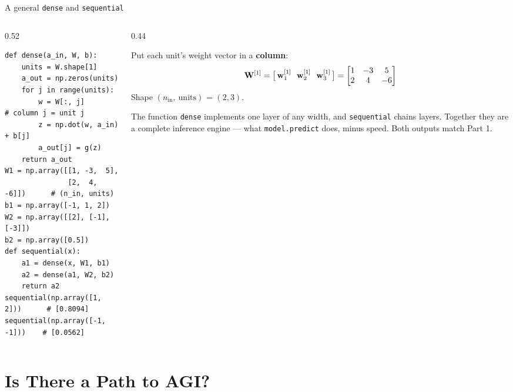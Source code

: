 \documentclass[aspectratio=169,10pt]{beamer}
\begin{document}
\begin{frame}[fragile]{A general \texttt{dense} and \texttt{sequential}}
  \begin{columns}[T,onlytextwidth]
    \begin{column}{0.52\textwidth}
\begin{lstlisting}
def dense(a_in, W, b):
    units = W.shape[1]
    a_out = np.zeros(units)
    for j in range(units):
        w = W[:, j]               # column j = unit j
        z = np.dot(w, a_in) + b[j]
        a_out[j] = g(z)
    return a_out
W1 = np.array([[1, -3,  5],
               [2,  4, -6]])      # (n_in, units)
b1 = np.array([-1, 1, 2])
W2 = np.array([[2], [-1], [-3]])
b2 = np.array([0.5])
def sequential(x):
    a1 = dense(x, W1, b1)
    a2 = dense(a1, W2, b2)
    return a2
sequential(np.array([1, 2]))      # [0.8094]
sequential(np.array([-1, -1]))    # [0.0562]
\end{lstlisting}
    \end{column}
    \begin{column}{0.44\textwidth}
      \footnotesize
      \begin{defnbox}
        \small
        Put each unit's weight vector in a \textbf{column}:
        \[ \mW^{[1]} = \bigl[\,\vw^{[1]}_1\ \ \vw^{[1]}_2\ \ \vw^{[1]}_3\,\bigr]
           = \begin{bmatrix}1&-3&5\\2&4&-6\end{bmatrix} \]
        Shape $(n_{\text{in}},\ \text{units})$ = $(2,3)$.
      \end{defnbox}
      \begin{keyidea}
        The function \texttt{dense} implements one layer of any width, and \texttt{sequential}
        chains layers. Together they are a complete inference engine --- what
        \texttt{model.predict} does, minus speed. Both outputs match Part 1.
      \end{keyidea}
    \end{column}
  \end{columns}
\end{frame}

\section{Is There a Path to AGI?}
\end{document}
